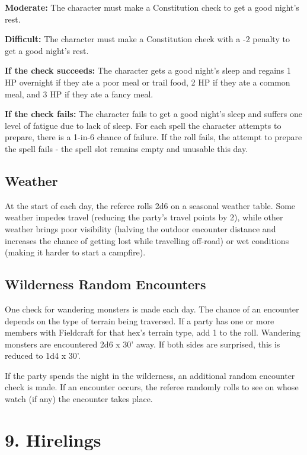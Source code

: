 \documentclass{book}
\begin{document}
\textbf{Moderate:} The character must make a Constitution check to get a
good night's rest.

\textbf{Difficult:} The character must make a Constitution check with a
-2 penalty to get a good night's rest.

\textbf{If the check succeeds:} The character gets a good night's sleep
and regains 1 HP overnight if they ate a poor meal or trail food, 2 HP
if they ate a common meal, and 3 HP if they ate a fancy meal.

\textbf{If the check fails:} The character fails to get a good night's
sleep and suffers one level of fatigue due to lack of sleep. For each
spell the character attempts to prepare, there is a 1-in-6 chance of
failure. If the roll fails, the attempt to prepare the spell fails - the
spell slot remains empty and unusable this day.



\subsection*{Weather}\label{weather}

At the start of each day, the referee rolls 2d6 on a seasonal weather
table. Some weather impedes travel (reducing the party's travel points
by 2), while other weather brings poor visibility (halving the outdoor
encounter distance and increases the chance of getting lost while
travelling off-road) or wet conditions (making it harder to start a
campfire).

\subsection*{Wilderness Random
Encounters}\label{wilderness-random-encounters}

One check for wandering monsters is made each day. The chance of an
encounter depends on the type of terrain being traversed. If a party has
one or more members with Fieldcraft for that hex's terrain type, add 1
to the roll. Wandering monsters are encountered 2d6 x 30' away. If both
sides are surprised, this is reduced to 1d4 x 30'.

If the party spends the night in the wilderness, an additional random
encounter check is made. If an encounter occurs, the referee randomly
rolls to see on whose watch (if any) the encounter takes place.

\section*{9. Hirelings}\label{hirelings}
\end{document}

